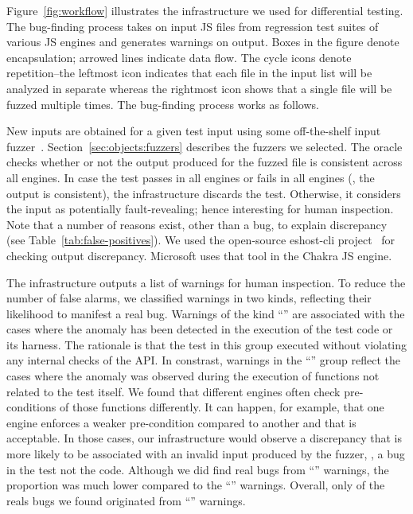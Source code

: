 \documentclass[10pt,conference,anonymous]{IEEEtran}
\begin{document}
Figure~\ref{fig:workflow} illustrates the infrastructure we used for
differential testing.  The bug-finding process takes on input JS files
from regression test suites of various JS engines and generates
warnings on output. Boxes in the figure denote encapsulation; arrowed
lines indicate data flow. The cycle icons denote repetition--the
leftmost icon indicates that each file in the input list will be
analyzed in separate whereas the rightmost icon shows that a single
file will be fuzzed multiple times. The bug-finding process works as
follows.

New inputs are obtained for a given test input using some
off-the-shelf input fuzzer~\cite{fuzz-testing-history}.
Section~\ref{sec:objects:fuzzers} describes the fuzzers we selected.
The oracle checks whether or not the output produced for the fuzzed
file is consistent across all engines. In case the test passes in all
engines or fails in all engines (\ie{}, the output is consistent), the
infrastructure discards the test. Otherwise, it considers the input as
potentially fault-revealing; hence interesting for human
inspection. Note that a number of reasons exist, other than a bug, to
explain discrepancy (see Table~\ref{tab:false-positives}). We used the
open-source eshost-cli project~\cite{eshost-cli} for checking output
discrepancy. Microsoft uses that tool in the Chakra JS engine.


The infrastructure outputs a list of warnings for human inspection.
To reduce the number of false alarms, we classified warnings in two
kinds, reflecting their likelihood to manifest a real bug. Warnings of
the kind ``\hi{}'' are associated with the cases where the anomaly has
been detected in the execution of the test code or its harness. The
rationale is that the test in this group executed without violating
any internal checks of the API. In constrast, warnings in the
``\lo{}'' group reflect the cases where the anomaly was observed
during the execution of functions not related to the test itself. We
found that different engines often check pre-conditions of those
functions differently. It can happen, for example, that one engine
enforces a weaker pre-condition compared to another and that is
acceptable.  In those cases, our infrastructure would observe a
discrepancy that is more likely to be associated with an invalid input
produced by the fuzzer, \ie{}, a bug in the test not the
code. Although we did find real bugs from ``\lo{}'' warnings, the
proportion was much lower compared to the ``\hi{}'' warnings. Overall,
only  of the reals bugs we found originated from ``\lo{}''
warnings.
\end{document}
